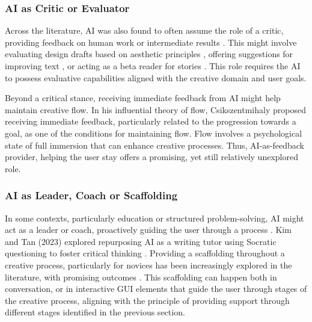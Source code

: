 \subsubsection{AI as Critic or Evaluator}
Across the literature, AI was also found to often assume the role of a critic, providing feedback on human work or intermediate results \cite{Lin2023-zq}. This might involve evaluating design drafts based on aesthetic principles \cite{Zhou2024-vp}, offering suggestions for improving text \cite{Chakrabarty2024-ov}, or acting as a beta reader for stories \cite{Ippolito2022-mf}. This role requires the AI to possess evaluative capabilities aligned with the creative domain and user goals.

Beyond a critical stance, receiving immediate feedback from AI might help maintain creative flow. In his influential theory of flow, Csikszentmihaly \cite{Csikszentmihalyi1990-hu} proposed receiving immediate feedback, particularly related to the progression towards a goal, as one of the conditions for maintaining flow. Flow involves a psychological state of full immersion that can enhance creative processes. Thus, AI-as-feedback provider, helping the user stay offers a promising, yet still relatively unexplored role. 

\subsubsection{AI as Leader, Coach or Scaffolding}

In some contexts, particularly education or structured problem-solving, AI might act as a leader or coach, proactively guiding the user through a process \cite{Zhong2024-ij}. Kim and Tan (2023) explored repurposing AI as a writing tutor using Socratic questioning to foster critical thinking \cite{Kim2023-wt}. Providing a scaffolding throughout a creative process, particularly for novices has been increasingly explored in the literature, with promising outcomes \cite{Yuan2022-kb, Fan2019-qq, Ding2024-ta, Long2019-lw, Louie2020-aq, Ippolito2022-mf, Wadinambiarachchi2024-jn}. This scaffolding can happen both in conversation, or in interactive GUI elements that guide the user through stages of the creative process, aligning with the principle of providing support through different stages identified in the previous section. 


